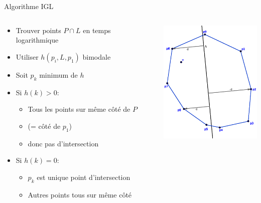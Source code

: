 \documentclass{beamer}
\begin{document}
\begin{frame}{Algorithme IGL}
	\begin{columns}[c]
	\begin{column}[T]{.5\textwidth}
		\begin{itemize}
		\item Trouver points $P \cap L$ en temps logarithmique
		\item Utiliser $h(p_{i}, L, p_{1})$ bimodale
		\item Soit $p_{k}$ minimum de $h$
		\item Si $h(k) > 0$:
			\begin{itemize}
			\item Tous les points sur même côté de $P$
			\item (= côté de $p_{1}$)
			\item donc pas d'intersection
			\end{itemize}
		\item Si $h(k) = 0$:
			\begin{itemize}
			\item $p_{k}$ est unique point d'intersection
			\item Autres points tous sur même côté
			\end{itemize}
		\end{itemize}
	\end{column}
	\begin{column}[T]{.5\textwidth}
		\includegraphics[width=5cm]{h.eps}
	\end{column}
	\end{columns}
\end{frame}
\end{document}
